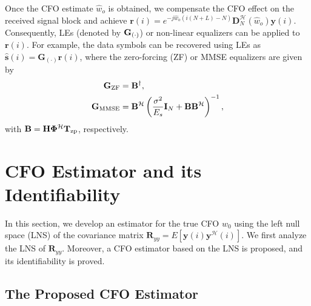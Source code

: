 \documentclass[journal]{IEEEtran}
\begin{document}
Once the CFO estimate $\hat{w}_o$ is obtained, we compensate the CFO effect on the received signal block and achieve $\mathbf{r}(i) = e^{-j \hat{w}_o(i(N+L)-N)}\mathbf{D}_N^\mathcal{H}(\hat{w}_o)\mathbf{y}(i)$. Consequently, LEs \big(denoted by $\bf G_{(\cdot)}$\big) or non-linear equalizers can be applied to $\mathbf{r}(i)$. For example, the data symbols can be recovered using LEs as $\hat{\mathbf{s}}(i) = \mathbf{G}_{(\cdot)}\mathbf{r}(i)$, where the zero-forcing (ZF) or MMSE equalizers are given by
\begin{align}
\mathbf{G}_{\rm ZF}&=  \mathbf{B}^\dagger ,\label{ZF-FDE}\\
\mathbf{G}_{\rm MMSE}&=  \mathbf{B}^\mathcal{H} \left( \frac{\sigma^2}{E_{s}}\mathbf{I}_N+\mathbf{B}\mathbf{B}^\mathcal{H} \right)^{-1},\label{MMSE-FDE}
\end{align}
with \(\mathbf{B}={\mathbf{H}}\mathbf{\Phi}^\mathcal{H}\mathbf{T}_{\rm zp}\), respectively.

\section{CFO Estimator and its Identifiability}

In this section, we develop an estimator for the true CFO \(w_0\) using the left null space (LNS) of the covariance matrix \(\mathbf{R}_{yy}=E[\mathbf{y}(i)\mathbf{y}^{\mathcal{H}}(i)]\). We first analyze the LNS of ${\mathbf{R}}_{yy}$. %
Moreover, a CFO estimator based on the LNS is proposed, and its identifiability is proved.


\subsection{The Proposed CFO Estimator}
\end{document}
